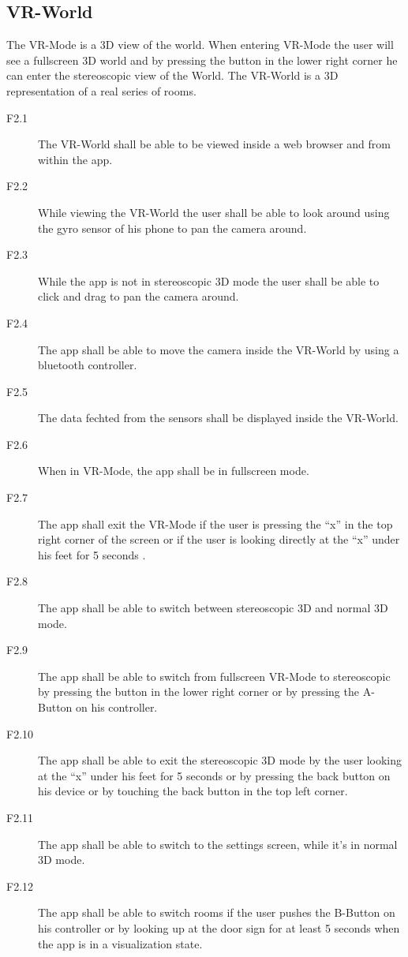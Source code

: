 \subsection{VR-World}
  The VR-Mode is a 3D view of the world. When entering VR-Mode the user will see a fullscreen 3D world and by pressing the button in the lower right corner he can enter the  stereoscopic view of the World.
  The VR-World is a 3D representation of a real series of rooms.
  \begin{description}
    \item[F2.1] The VR-World shall be able to be viewed inside a web browser and from within the app.
    \item[F2.2] While viewing the VR-World the user shall be able to look around using the gyro sensor of his phone to pan the camera around.
    \item[F2.3] While the app is not in stereoscopic 3D mode the user shall be able to click and drag to pan the camera around.
    \item[F2.4] The app shall be able to move the camera inside the VR-World by using a bluetooth controller.
    \item[F2.5] The data fechted from the sensors shall be displayed inside the VR-World.
    \item[F2.6] When in VR-Mode, the app shall be in fullscreen mode.
    \item[F2.7] The app shall exit the VR-Mode if the user is pressing the ``x'' in the top right corner of the screen or if the user is looking directly at the ``x'' under his feet for 5 seconds .
    \item[F2.8] The app shall be able to switch between stereoscopic 3D and normal 3D mode.
    \item[F2.9] The app shall be able to switch from fullscreen VR-Mode to stereoscopic by pressing the button in the lower right corner or by pressing the A-Button on his controller.
    \item[F2.10] The app shall be able to exit the stereoscopic 3D mode by the user looking at the ``x'' under his feet for 5 seconds or by pressing the back button on his device or by touching the back button in the top left corner.
    \item[F2.11] The app shall be able to switch to the settings screen, while it's in normal 3D mode.
    \item[F2.12] The app shall be able to switch rooms if the user pushes the B-Button on his controller or by looking up at the door sign for at least 5 seconds when the app is in a visualization state.

\end{description}
